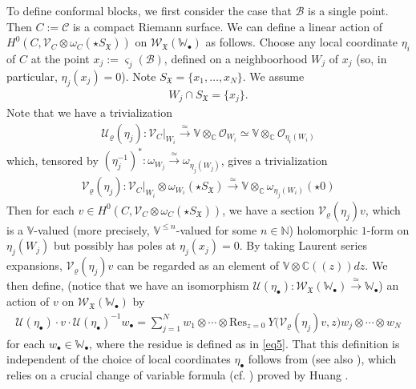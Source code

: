 \documentclass[12pt,a4paper,notitlepage]{article}
\theoremstyle{definition}
\theoremstyle{plain}
\newcommand{\fk}{\mathfrak}
\newcommand{\mc}{\mathcal}
\newcommand{\Res}{\mathrm{Res}}
\newcommand{\scr}{\mathscr}
\newcommand{\sgm}{\varsigma}
\newcommand{\SX}{{S_{\fk X}}}
\newcommand{\blt}{\bullet}
\newcommand{\Vbb}{\mathbb V}
\newcommand{\Wbb}{\mathbb W}
\newcommand{\Cbb}{\mathbb C}
\newcommand{\Nbb}{\mathbb N}
\numberwithin{equation}{section}
\begin{document}


To define conformal blocks, we first consider the case that $\mc B$ is a single point. Then $C:=\mc C$ is a compact Riemann surface. We can define a linear action of $H^0(C,\scr V_C\otimes\omega_C(\star\SX))$ on $\scr W_{\fk X}(\Wbb_\blt)$ as follows. Choose any local coordinate $\eta_i$ of $C$ at the point $x_j:=\sgm_j(\mc B)$, defined on a neighboorhood $W_j$ of $x_j$ (so, in particular, $\eta_j(x_j)=0$). Note $\SX=\{x_1,\dots,x_N\}$. We assume
\begin{align*}
W_j\cap\SX=\{x_j\}.	
\end{align*}
Note that we have a trivialization
\begin{align*}
\mc U_\varrho(\eta_j):\scr V_C|_{W_i}\xrightarrow{\simeq} \Vbb\otimes_\Cbb\scr O_{W_i}\simeq	\Vbb\otimes_\Cbb\scr O_{\eta_i(W_i)}
\end{align*} 
which, tensored by $(\eta_j^{-1})^*:\omega_{W_j}\xrightarrow{\simeq}\omega_{\eta_j(W_j)}$, gives a trivialization \index{V@$\mc V_\varrho(\eta_j)$}
\begin{align*}
\mc V_\varrho(\eta_j):\scr V_C|_{W_i}\otimes\omega_{W_i}(\star\SX)\xrightarrow{\simeq} \Vbb\otimes_\Cbb\omega_{\eta_j(W_i)}(\star 0)	
\end{align*} 
Then for each $v\in H^0(C,\scr V_C\otimes\omega_C(\star\SX))$, we have a section $\mc V_\varrho(\eta_j)v$, which is a $\Vbb$-valued (more precisely, $\Vbb^{\leq n}$-valued for some $n\in\Nbb$) holomorphic $1$-form on $\eta_j(W_j)$ but possibly has poles at $\eta_j(x_j)=0$. By taking Laurent series expansions, $\mc V_\varrho(\eta_j)v$ can be regarded as an element of $\Vbb\otimes\Cbb((z))dz$. We then define, (notice that we have an isomorphism $\mc U(\eta_\blt):\scr W_{\fk X}(\Wbb_\blt)\xrightarrow{\simeq}\Wbb_\blt$) an action of $v$ on $\scr W_{\fk X}(\Wbb_\blt)$ by
\begin{align*}
\mc U(\eta_\blt)\cdot v\cdot \mc U(\eta_\blt)^{-1}w_\blt=\sum_{j=1}^N w_1\otimes\cdots\otimes \Res_{z=0}~Y\big(\mc V_\varrho(\eta_j)v,z\big)w_j\otimes\cdots\otimes w_N
\end{align*}
for each $w_\blt\in\Wbb_\blt$, where the residue is defined as in \eqref{eq5}. That this definition is independent of the choice of local coordinates $\eta_\blt$ follows from \cite[Thm. 6.5.4]{FB04} (see also \cite[Thm. 3.2]{Gui20}), which relies on a crucial change of variable formula (cf. \cite[Thm. 3.3]{Gui20}) proved by Huang \cite{Hua97}.
\end{document}
